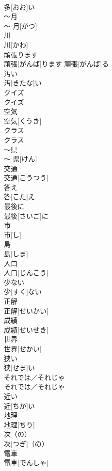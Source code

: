 \documentclass[8pt]{extreport}
\begin{document}
\begin{CJK}{UTF8}{min}
\\	多[おお]い		
\\	〜月	
\\	〜 月[がつ]		
\\	川	
\\	川[かわ]		
\\	頑張ります	
\\	頑張[がんば]ります	頑張[がんば]る	
\\	汚い	
\\	汚[きたな]い		
\\	クイズ	
\\	クイズ		
\\	空気	
\\	空気[くうき]		
\\	クラス	
\\	クラス		
\\	〜県	
\\	〜 県[けん]		
\\	交通	
\\	交通[こうつう]		
\\	答え	
\\	答[こた]え		
\\	最後に	
\\	最後[さいご]に		
\\	市	
\\	市[し]		
\\	島	
\\	島[しま]		
\\	人口	
\\	人口[じんこう]		
\\	少ない	
\\	少[すく]ない		
\\	正解	
\\	正解[せいかい]		
\\	成績	
\\	成績[せいせき]		
\\	世界	
\\	世界[せかい]		
\\	狭い	
\\	狭[せま]い		
\\	それでは／それじゃ	
\\	それでは／それじゃ		
\\	近い	
\\	近[ちか]い		
\\	地理	
\\	地理[ちり]		
\\	次（の）	
\\	次[つぎ]（の）		
\\	電車	
\\	電車[でんしゃ]		

\end{CJK}
\end{document}
